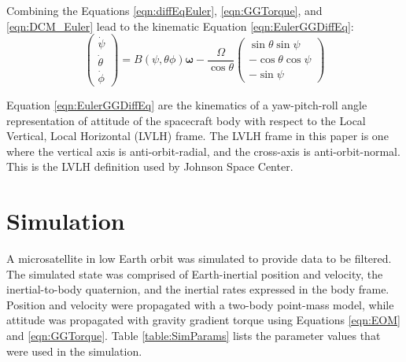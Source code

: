 \documentclass[]{aiaa-tc}%
\begin{document}
Combining the Equations \ref{eqn:diffEqEuler}, \ref{eqn:GGTorque}, and \ref{eqn:DCM_Euler} lead to the kinematic Equation \ref{eqn:EulerGGDiffEq}\cite{SchaubJunkins}:
	\begin{equation}
		\begin{pmatrix}
		\dot{\psi}\\ 
		\dot{\theta}\\ 
		\dot{\phi}
		\end{pmatrix} = 
		B(\psi,\theta\phi)\boldsymbol{\omega}-\frac{\Omega}{\cos\theta}\begin{pmatrix}
		\sin\theta\sin\psi\\ 
		-\cos\theta\cos\psi\\ 
		-\sin\psi
		\end{pmatrix}
		\label{eqn:EulerGGDiffEq}
	\end{equation}

Equation \ref{eqn:EulerGGDiffEq} are the kinematics of a yaw-pitch-roll angle representation of attitude of the spacecraft body with respect to the Local Vertical, Local Horizontal (LVLH) frame. The LVLH frame in this paper is one where the vertical axis is anti-orbit-radial, and the cross-axis is anti-orbit-normal. This is the LVLH definition used by Johnson Space Center.

	\section{Simulation}

A microsatellite in low Earth orbit was simulated to provide data to be filtered. The simulated state was comprised of Earth-inertial position and velocity, the inertial-to-body quaternion, and the inertial rates expressed in the body frame. Position and velocity were propagated with a two-body point-mass model, while attitude was propagated with gravity gradient torque using Equations \ref{eqn:EOM} and \ref{eqn:GGTorque}. Table \ref{table:SimParams} lists the parameter values that were used in the simulation.
\end{document}
